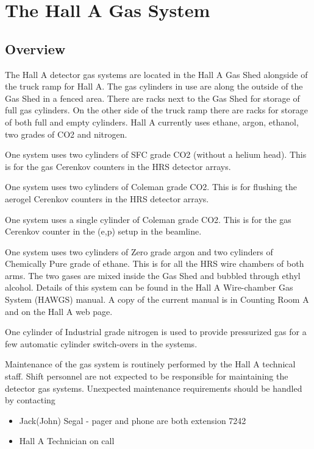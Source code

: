 \section{The Hall A Gas System}

\subsection{Overview}
The Hall A detector gas systems are located in the Hall A Gas Shed
alongside of the truck ramp for Hall A.  The gas cylinders in use
are along the outside of the Gas Shed in a fenced area.
There are racks next to
the Gas Shed for storage of full gas cylinders.  On the other side of the
truck ramp there are racks for storage of both full and empty cylinders.
Hall A currently uses ethane, argon, ethanol, two grades of CO2
and nitrogen.

One system uses two cylinders of SFC grade CO2 (without a helium head).
This is for the gas Cerenkov counters in the HRS detector arrays.

One system uses two cylinders of Coleman grade CO2.  This is for
flushing the aerogel Cerenkov counters in the HRS detector arrays.

One system uses a single cylinder of Coleman grade CO2.  This is for
the gas Cerenkov counter in the (e,p) setup in the beamline.

One system uses two cylinders of Zero grade argon and two cylinders
of Chemically Pure grade of ethane.  This is for all the HRS wire chambers
of both arms.  The two gases are mixed inside the Gas Shed and bubbled
through ethyl alcohol.  Details of this system can be found in the
Hall A Wire-chamber Gas System (HAWGS) manual.  A copy of the current
manual is in Counting Room A and on the Hall A web page.

One cylinder of Industrial grade nitrogen is used to provide pressurized
gas for a few automatic cylinder switch-overs in the systems.

Maintenance of the gas system is routinely performed by the Hall A
technical staff.  Shift personnel are not expected to be responsible
for maintaining the detector gas systems.  Unexpected maintenance
requirements should be handled by contacting

\begin{itemize} 
\item[~]Jack(John) Segal - pager and phone are both extension 7242
\item[~]Hall A Technician on call
\end{itemize} 

